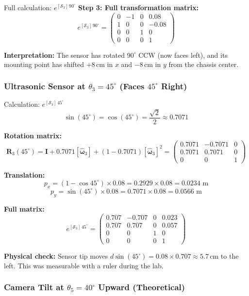 \documentclass[12pt,a4paper]{article}
\newcommand{\vect}[1]{\bm{#1}}
\newcommand{\mat}[1]{\mathbf{#1}}
\begin{document}
\begin{mathbox}{Full calculation: $e^{[\mathcal{S}_3]\,90^\circ}$}
\textbf{Step 3: Full transformation matrix:}
\[
  e^{[\mathcal{S}_3]\,90^\circ}
  = \begin{pmatrix}0&-1&0&0.08\\1&0&0&-0.08\\0&0&1&0\\0&0&0&1\end{pmatrix}
\]

\textbf{Interpretation:} The sensor has rotated $90^\circ$ CCW (now faces left),
and its mounting point has shifted $+8$\,cm in $x$ and $-8$\,cm in $y$
from the chassis center.
\end{mathbox}

\subsubsection{Ultrasonic Sensor at $\theta_3 = 45^\circ$ (Faces $45^\circ$ Right)}

\begin{mathbox}{Calculation: $e^{[\mathcal{S}_3]\,45^\circ}$}
\[
  \sin(45^\circ) = \cos(45^\circ) = \frac{\sqrt{2}}{2} \approx 0.7071
\]

\textbf{Rotation matrix:}
\[
  \mat{R}_3(45^\circ)
  = \mat{I} + 0.7071[\vect{\hat\omega}_3] + (1-0.7071)[\vect{\hat\omega}_3]^2
  = \begin{pmatrix}0.7071&-0.7071&0\\0.7071&0.7071&0\\0&0&1\end{pmatrix}
\]

\textbf{Translation:}
\[
  p_x = (1-\cos 45^\circ)\times 0.08 = 0.2929 \times 0.08 = 0.0234\text{ m}
\]
\[
  p_y = \sin(45^\circ) \times 0.08 = 0.7071 \times 0.08 = 0.0566\text{ m}
\]

\textbf{Full matrix:}
\[
  e^{[\mathcal{S}_3]\,45^\circ}
  = \begin{pmatrix}
      0.707 & -0.707 & 0 & 0.023 \\
      0.707 &  0.707 & 0 & 0.057 \\
      0     &  0     & 1 & 0     \\
      0     &  0     & 0 & 1
    \end{pmatrix}
\]

\textbf{Physical check:} Sensor tip moves
$d\sin(45^\circ) = 0.08 \times 0.707 \approx 5.7$\,cm to the left.
This was measurable with a ruler during the lab.
\end{mathbox}

\subsubsection{Camera Tilt at $\theta_5 = 40^\circ$ Upward (Theoretical)}
\end{document}
